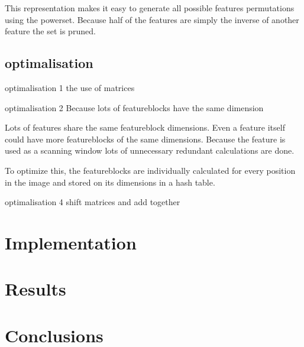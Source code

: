 \documentclass[a4paper,11pt]{article}
\begin{document}
	This representation makes it easy to generate all possible features
	permutations using the powerset.  Because half of the features are simply
	the inverse of another feature the set is pruned.

	\subsection{optimalisation}
	optimalisation 1
	the use of matrices 

	optimalisation 2
	Because lots of featureblocks have the same dimension

	Lots of features share the same featureblock dimensions. Even a feature
	itself could have more featureblocks of the same dimensions.  Because the
	feature is used as a scanning window lots of unnecessary redundant
	calculations are done.

	To optimize this, the featureblocks are individually calculated for every
	position in the image and stored on its dimensions in a hash table.

	optimalisation 4
	shift matrices and add together


\section*{Implementation}

\section*{Results}

\section*{Conclusions}
\end{document}
